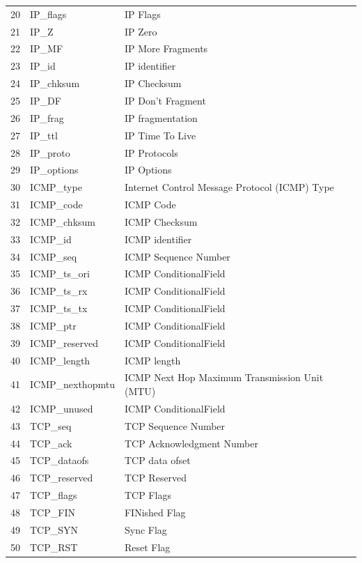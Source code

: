 \documentclass[journal]{IEEEtran}
\begin{document}
\begin{table}[htbp]
{\begin{tabular}{rll}
			20    & IP\_flags & IP Flags \\
			\rowcolor[rgb]{ .851,  .851,  .851} 21    & IP\_Z & IP Zero \\
			22    & IP\_MF & IP More Fragments \\
			\rowcolor[rgb]{ .851,  .851,  .851} 23    & IP\_id & IP identifier \\
			24    & IP\_chksum & IP Checksum \\
			\rowcolor[rgb]{ .851,  .851,  .851} 25    & IP\_DF & IP Don’t Fragment \\
			26    & IP\_frag & IP fragmentation \\
			\rowcolor[rgb]{ .851,  .851,  .851} 27    & IP\_ttl & IP Time To Live \\
			28    & IP\_proto & IP Protocols \\
			\rowcolor[rgb]{ .851,  .851,  .851} 29    & IP\_options & IP Options \\
			30    & ICMP\_type & Internet Control Message Protocol (ICMP) Type \\
			\rowcolor[rgb]{ .851,  .851,  .851} 31    & ICMP\_code & ICMP Code \\
			32    & ICMP\_chksum & ICMP Checksum \\
			\rowcolor[rgb]{ .851,  .851,  .851} 33    & ICMP\_id & ICMP identifier \\
			34    & ICMP\_seq & ICMP Sequence Number \\
			\rowcolor[rgb]{ .851,  .851,  .851} 35    & ICMP\_ts\_ori & ICMP ConditionalField      \\
			36    & ICMP\_ts\_rx & ICMP ConditionalField      \\
			\rowcolor[rgb]{ .851,  .851,  .851} 37    & ICMP\_ts\_tx & ICMP ConditionalField      \\
			38    & ICMP\_ptr & ICMP ConditionalField      \\
			\rowcolor[rgb]{ .851,  .851,  .851} 39    & ICMP\_reserved & ICMP ConditionalField      \\
			40    & ICMP\_length & ICMP  length \\
			\rowcolor[rgb]{ .851,  .851,  .851} 41    & ICMP\_nexthopmtu & ICMP Next Hop Maximum Transmission Unit (MTU) \\
			42    & ICMP\_unused & ICMP ConditionalField      \\
			\rowcolor[rgb]{ .851,  .851,  .851} 43    & TCP\_seq & TCP Sequence Number \\
			44    & TCP\_ack & TCP Acknowledgment Number \\
			\rowcolor[rgb]{ .851,  .851,  .851} 45    & TCP\_dataofs & TCP data ofset \\
			46    & TCP\_reserved & TCP Reserved \\
			\rowcolor[rgb]{ .851,  .851,  .851} 47    & TCP\_flags & TCP Flags \\
			48    & TCP\_FIN & FINished Flag \\
			\rowcolor[rgb]{ .851,  .851,  .851} 49    & TCP\_SYN & Sync Flag \\
			50    & TCP\_RST & Reset Flag \\
			

\end{tabular}}
\end{table}
\end{document}
